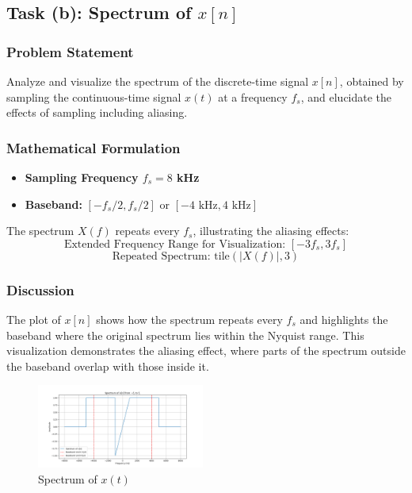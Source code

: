 
\item[(b)]
\subsection{Task (b): Spectrum of $x[n]$}

\subsubsection{Problem Statement}
Analyze and visualize the spectrum of the discrete-time signal $x[n]$, obtained by sampling the continuous-time signal $x(t)$ at a frequency $f_s$, and elucidate the effects of sampling including aliasing.

\subsubsection{Mathematical Formulation}
\begin{itemize}
    \item \textbf{Sampling Frequency $f_s = 8$ kHz}
    \item \textbf{Baseband:} $[-f_s/2, f_s/2]$ or $[-4 \text{ kHz}, 4 \text{ kHz}]$
\end{itemize}

The spectrum $X(f)$ repeats every $f_s$, illustrating the aliasing effects:
\[
\text{Extended Frequency Range for Visualization: } [-3f_s, 3f_s]
\]
\[
\text{Repeated Spectrum: } \text{tile}( |X(f)|, 3)
\]

\subsubsection{Discussion}
The plot of $x[n]$ shows how the spectrum repeats every $f_s$ and highlights the baseband where the original spectrum lies within the Nyquist range. This visualization demonstrates the aliasing effect, where parts of the spectrum outside the baseband overlap with those inside it.

\begin{figure}[h]
    \centering
    \includegraphics[width=0.49\textwidth]{fig/ex2_b_plot}
    \caption{Spectrum of \(x(t)\)}
    \label{fig:ex2_b_plot}
\end{figure}
